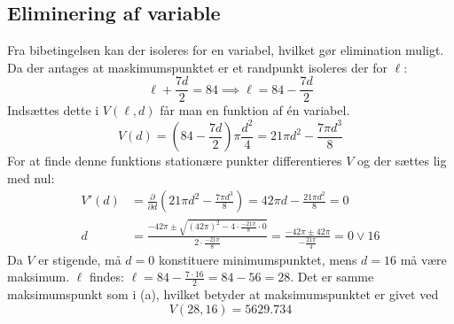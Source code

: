 \documentclass{report}
\begin{document}
\subsection{Eliminering af variable}
Fra bibetingelsen kan der isoleres for en variabel, hvilket gør elimination muligt. Da der antages at maskimumspunktet er et randpunkt isoleres der for $\ell$:$$\ell+\frac{7d}{2}=84\implies \ell=84-\frac{7d}{2}$$Indsættes dette i $V(\ell,d)$ får man en funktion af én variabel.$$V(d)=\left(84-\frac{7d}{2}\right)\pi\frac{d^2}{4}=21\pi d^2-\frac{7\pi d^3}{8}$$For at finde denne funktions stationære punkter differentieres $V$ og der sættes lig med nul:
\begin{align*}
    V'(d)&=\frac{\partial}{\partial d}\left(21\pi d^2-\frac{7\pi d^3}{8}\right)=42\pi d-\frac{21\pi d^2}{8}=0\\
    d&=\frac{-42\pi\pm\sqrt{(42\pi)^2-4\cdot\frac{-21\pi}{8}\cdot0}}{2\cdot\frac{-21\pi}{8}}=\frac{-42\pi\pm42\pi}{-\frac{21\pi}{4}}=0\lor16
\end{align*}
Da $V$ er stigende, må $d=0$ konstituere minimumspunktet, mens $d=16$ må være maksimum. $\ell$ findes: $\ell=84-\frac{7\cdot16}{2}=84-56=28$. Det er samme maksimumspunkt som i (a), hvilket betyder at maksimumspunktet er givet ved$$V(28,16)=5629.734$$
\end{document}
